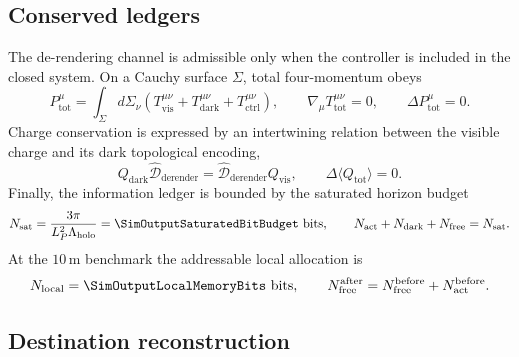 \subsection{Conserved ledgers}

The de-rendering channel is admissible only when the controller is included
in the closed system.  On a Cauchy surface \(\Sigma\), total four-momentum
obeys
\begin{equation}
  P_{\mathrm{tot}}^{\mu}
  =\int_{\Sigma}d\Sigma_{\nu}
  \left(
    T_{\mathrm{vis}}^{\mu\nu}
    +T_{\mathrm{dark}}^{\mu\nu}
    +T_{\mathrm{ctrl}}^{\mu\nu}
  \right),
  \qquad
  \nabla_{\mu}T_{\mathrm{tot}}^{\mu\nu}=0,
  \qquad
  \Delta P_{\mathrm{tot}}^{\mu}=0.
  \label{eq:derendering-momentum-conservation}
\end{equation}
Charge conservation is expressed by an intertwining relation between the
visible charge and its dark topological encoding,
\begin{equation}
  Q_{\mathrm{dark}}
  \widehat{\mathcal D}_{\mathrm{derender}}
  =\widehat{\mathcal D}_{\mathrm{derender}}Q_{\mathrm{vis}},
  \qquad
  \Delta\langle Q_{\mathrm{tot}}\rangle=0.
  \label{eq:derendering-charge-conservation}
\end{equation}
Finally, the information ledger is bounded by the saturated horizon budget
\begin{equation}
  N_{\mathrm{sat}}
  =\frac{3\pi}{L_P^2\Lambda_{\mathrm{holo}}}
  =\SimOutputSaturatedBitBudget\ \text{bits},
  \qquad
  N_{\mathrm{act}}+N_{\mathrm{dark}}+N_{\mathrm{free}}
  =N_{\mathrm{sat}}.
  \label{eq:saturated-bit-conservation}
\end{equation}
At the \(10\,\mathrm{m}\) benchmark the addressable local allocation is
\begin{equation}
  N_{\mathrm{local}}
  =\SimOutputLocalMemoryBits\ \text{bits},
  \qquad
  N_{\mathrm{free}}^{\mathrm{after}}
  =N_{\mathrm{free}}^{\mathrm{before}}+N_{\mathrm{act}}^{\mathrm{before}}.
  \label{eq:local-bit-release}
\end{equation}

\subsection{Destination reconstruction}

